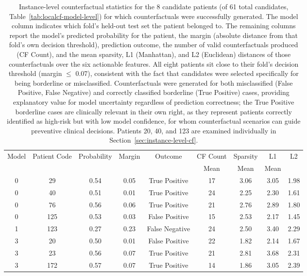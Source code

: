 \documentclass[pdflatex,sn-mathphys-num]{sn-jnl}%
\theoremstyle{thmstyleone}%
\theoremstyle{thmstyletwo}%
\theoremstyle{thmstylethree}%
\begin{document}
\begin{appendices}
\begin{table}[tbp]
    \footnotesize
    \centering
    \setlength{\tabcolsep}{4pt}
    \begin{tabular}{ccccccccc}
        \toprule
        Model & Patient Code & Probability & Margin & Outcome & CF Count & Sparsity  & L1 & L2 \\
         &  &  &  & & Mean & Mean & Mean \\
        \midrule
        0 & 29 & 0.54 & 0.05 & True Positive & 17 & 3.06 & 3.05 & 1.98 \\
        0 & 40 & 0.51 & 0.01 & True Positive & 24 & 2.25 & 2.30 & 1.61 \\
        0 & 76 & 0.56 & 0.06 & True Positive & 21 & 2.76 & 2.89 & 1.80 \\
        0 & 125 & 0.53 & 0.03 & False Positive & 15 & 2.53 & 2.17 & 1.45 \\
        1 & 123 & 0.27 & 0.23 & False Negative & 24 & 2.50 & 3.40 & 2.29 \\
        3 & 20 & 0.50 & 0.01 & False Positive & 22 & 1.82 & 2.14 & 1.67 \\
        3 & 23 & 0.56 & 0.07 & True Positive & 21 & 2.81 & 3.68 & 2.31 \\
        3 & 172 & 0.57 & 0.07 & True Positive & 14 & 1.86 & 3.05 & 2.39 \\
        \bottomrule
    \end{tabular}
    \caption{Instance-level counterfactual statistics for the 8 candidate patients (of 61 total candidates, Table~\ref{tab:localcf-model-level}) for which counterfactuals were successfully generated. The model column indicates which fold's held-out test set the patient belonged to. The remaining columns report the model's predicted probability for the patient, the margin (absolute distance from that fold's own decision threshold), prediction outcome, the number of valid counterfactuals produced (CF Count), and the mean sparsity, L1 (Manhattan), and L2 (Euclidean) distances of those counterfactuals over the six actionable features. All eight patients sit close to their fold's decision threshold (margin $\le$ 0.07), consistent with the fact that candidates were selected specifically for being borderline or misclassified. Counterfactuals were generated for both misclassified (False Positive, False Negative) and correctly classified borderline (True Positive) cases, providing explanatory value for model uncertainty regardless of prediction correctness; the True Positive borderline cases are clinically relevant in their own right, as they represent patients correctly identified as high-risk but with low model confidence, for whom counterfactual scenarios can guide preventive clinical decisions. Patients 20, 40, and 123 are examined individually in Section~\ref{sec:instance-level-cf}.
    }
    \label{tab:localcf-listing}
\end{table}


\end{appendices}
\end{document}
